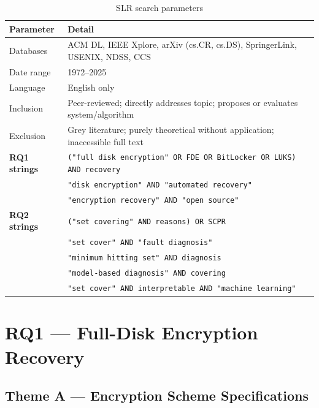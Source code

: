 \documentclass[11pt,a4paper]{report}
\begin{document}
\begin{table}[htbp]
\centering
\caption{SLR search parameters}
\label{tab:slrprotocol}
\begin{tabular}{@{}ll@{}}
\toprule
\textbf{Parameter} & \textbf{Detail} \\
\midrule
Databases & ACM DL, IEEE Xplore, arXiv (cs.CR, cs.DS), SpringerLink, USENIX, NDSS, CCS \\
Date range & 1972--2025 \\
Language & English only \\
Inclusion & Peer-reviewed; directly addresses topic; proposes or evaluates system/algorithm \\
Exclusion & Grey literature; purely theoretical without application; inaccessible full text \\
\midrule
\textbf{RQ1 strings} & \texttt{("full disk encryption" OR FDE OR BitLocker OR LUKS) AND recovery} \\
 & \texttt{"disk encryption" AND "automated recovery"} \\
 & \texttt{"encryption recovery" AND "open source"} \\
\textbf{RQ2 strings} & \texttt{("set covering" AND reasons) OR SCPR} \\
 & \texttt{"set cover" AND "fault diagnosis"} \\
 & \texttt{"minimum hitting set" AND diagnosis} \\
 & \texttt{"model-based diagnosis" AND covering} \\
 & \texttt{"set cover" AND interpretable AND "machine learning"} \\
\bottomrule
\end{tabular}
\end{table}

\chapter{RQ1 --- Full-Disk Encryption Recovery}

\section{Theme A --- Encryption Scheme Specifications}
\end{document}
